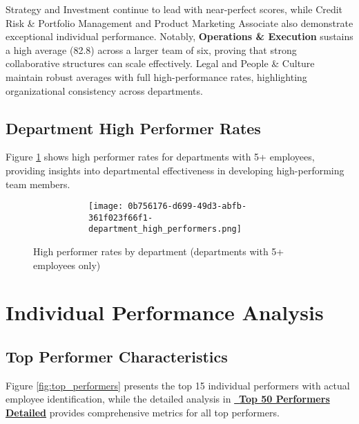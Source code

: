 \documentclass[12pt,a4paper]{article}
\begin{document}
Strategy and Investment continue to lead with near-perfect scores, while Credit Risk \& Portfolio Management and Product Marketing Associate also demonstrate exceptional individual performance. Notably, \textbf{Operations \& Execution} sustains a high average (82.8) across a larger team of six, proving that strong collaborative structures can scale effectively. Legal and People \& Culture maintain robust averages with full high-performance rates, highlighting organizational consistency across departments.


\subsection{Department High Performer Rates}

Figure \ref{fig:dept_high_performers} shows high performer rates for departments with 5+ employees, providing insights into departmental effectiveness in developing high-performing team members.

\begin{figure}[H]
\centering
\begin{figure}
    \centering
    \begin{figure}
        \centering
        \texttt{[image: 0b756176-d699-49d3-abfb-361f023f66f1-department\_high\_performers.png]}
    \end{figure}
\end{figure}
\caption{High performer rates by department (departments with 5+ employees only)}
\label{fig:dept_high_performers}
\end{figure}

\section{Individual Performance Analysis}

\subsection{Top Performer Characteristics}

Figure \ref{fig:top_performers} presents the top 15 individual performers with actual employee identification, while the detailed analysis in \textcolor{accentGold}{\href{https://fixysaskihumorizijuv.supabase.co/storage/v1/object/public/research-files/d7107b00-7e41-4006-a14b-1bd782f73914-top_50_performers_detailed.csv?download=}{{\normalsize\faMedal}\, \textbf{Top 50 Performers Detailed}}} provides comprehensive metrics for all top performers.
\end{document}

